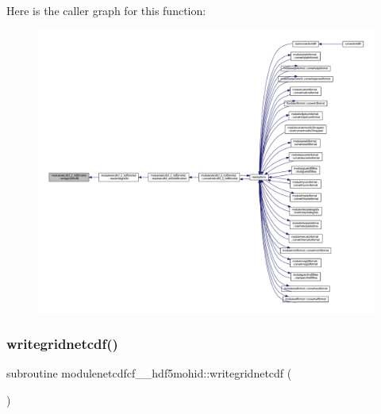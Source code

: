 Here is the caller graph for this function\+:\nopagebreak
\begin{figure}[H]
\begin{center}
\leavevmode
\includegraphics[width=350pt]{namespacemodulenetcdfcf__2__hdf5mohid_ab6beeef80ab10e31564937dcd13306eb_icgraph}
\end{center}
\end{figure}
\mbox{\label{namespacemodulenetcdfcf__2__hdf5mohid_ab80bf2060093fbfbc2ca158f9f70adc3}} 
\subsubsection{\texorpdfstring{writegridnetcdf()}{writegridnetcdf()}}
{\footnotesize\ttfamily subroutine modulenetcdfcf\+\_\+\_\+hdf5mohid\+::writegridnetcdf (\begin{DoxyParamCaption}{ }\end{DoxyParamCaption})\hspace{0.3cm}{\ttfamily [private]}}

